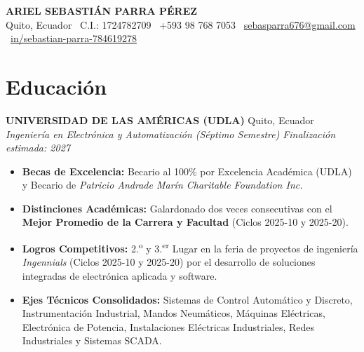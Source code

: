 \documentclass[10pt,a4paper]{article}
\begin{document}
\begin{center}
    {\LARGE \textbf{ARIEL SEBASTIÁN PARRA PÉREZ}} \\[3pt]
    Quito, Ecuador \textbar\ C.I.: 1724782709 \textbar\ +593 98 768 7053 \textbar\ \href{mailto:sebasparra676@gmail.com}{sebasparra676@gmail.com} \textbar\ \href{https://www.linkedin.com/in/sebastian-parra-784619278}{in/sebastian-parra-784619278}
\end{center}

\section{Educación}

\textbf{UNIVERSIDAD DE LAS AMÉRICAS (UDLA)} \hfill Quito, Ecuador \\
\textit{Ingeniería en Electrónica y Automatización (Séptimo Semestre)} \hfill \textit{Finalización estimada: 2027}
\begin{itemize}
    \item \textbf{Becas de Excelencia:} Becario al 100\% por Excelencia Académica (UDLA) y Becario de \textit{Patricio Andrade Marín Charitable Foundation Inc.}
    \item \textbf{Distinciones Académicas:} Galardonado dos veces consecutivas con el \textbf{Mejor Promedio de la Carrera y Facultad} (Ciclos 2025-10 y 2025-20).
    \item \textbf{Logros Competitivos:} 2.\textsuperscript{o} y 3.\textsuperscript{er} Lugar en la feria de proyectos de ingeniería \textit{Ingennials} (Ciclos 2025-10 y 2025-20) por el desarrollo de soluciones integradas de electrónica aplicada y software.
    \item \textbf{Ejes Técnicos Consolidados:} Sistemas de Control Automático y Discreto, Instrumentación Industrial, Mandos Neumáticos, Máquinas Eléctricas, Electrónica de Potencia, Instalaciones Eléctricas Industriales, Redes Industriales y Sistemas SCADA.
\end{itemize}

\end{document}

